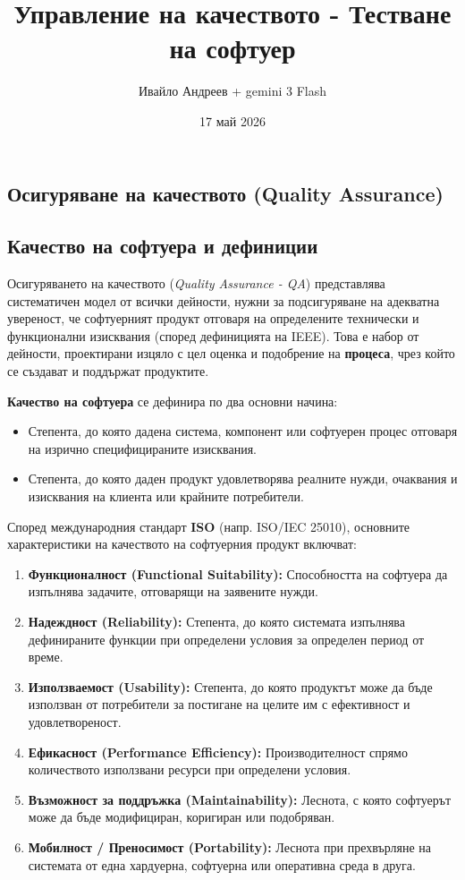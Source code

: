 \documentclass{scrartcl}
\title{Управление на качеството - Тестване на софтуер}
\author{Ивайло Андреев + gemini 3 Flash}
\date{17 май 2026}
\begin{document}
\maketitle

\tableofcontents

\newpage

\begin{FlushLeft}

\section{Осигуряване на качеството (Quality Assurance)}

\subsection{Качество на софтуера и дефиниции}
Осигуряването на качеството (\textit{Quality Assurance - QA}) представлява систематичен модел от всички дейности, нужни за подсигуряване на адекватна увереност, че софтуерният продукт отговаря на определените технически и функционални изисквания (според дефиницията на IEEE). Това е набор от дейности, проектирани изцяло с цел оценка и подобрение на \textbf{процеса}, чрез който се създават и поддържат продуктите.

\textbf{Качество на софтуера} се дефинира по два основни начина:
\begin{itemize}
    \item Степента, до която дадена система, компонент или софтуерен процес отговаря на изрично специфицираните изисквания.
    \item Степента, до която даден продукт удовлетворява реалните нужди, очаквания и изисквания на клиента или крайните потребители.
\end{itemize}

Според международния стандарт \textbf{ISO} (напр. ISO/IEC 25010), основните характеристики на качеството на софтуерния продукт включват:
\begin{enumerate}
    \item \textbf{Функционалност (Functional Suitability):} Способността на софтуера да изпълнява задачите, отговарящи на заявените нужди.
    \item \textbf{Надеждност (Reliability):} Степента, до която системата изпълнява дефинираните функции при определени условия за определен период от време.
    \item \textbf{Използваемост (Usability):} Степента, до която продуктът може да бъде използван от потребители за постигане на целите им с ефективност и удовлетвореност.
    \item \textbf{Ефикасност (Performance Efficiency):} Производителност спрямо количеството използвани ресурси при определени условия.
    \item \textbf{Възможност за поддръжка (Maintainability):} Леснота, с която софтуерът може да бъде модифициран, коригиран или подобряван.
    \item \textbf{Мобилност / Преносимост (Portability):} Леснота при прехвърляне на системата от една хардуерна, софтуерна или оперативна среда в друга.
\end{enumerate}


\end{FlushLeft}
\end{document}
